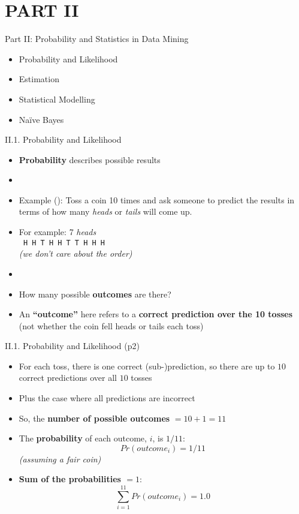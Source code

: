 \documentclass[handout]{beamer}
\newcommand{\strong}[1]{\textbf{\color{teal} #1}}
\newcommand{\stronger}[1]{\textbf{\color{purple} #1}}
\begin{document}
\section{PART II}
\begin{frame}{Part II: Probability and Statistics in Data Mining}
\begin{itemize}
\item[II.1.] Probability and Likelihood
\item[II.2.] Estimation
\item[II.3.] Statistical Modelling
\item[II.4.] Na\"{i}ve Bayes
\end{itemize}
\end{frame}
\begin{frame}{II.1. Probability and Likelihood}
\begin{itemize}
\item \stronger{Probability} describes possible results
\item[]
\item Example (\cite{gallistel:2015}):
Toss a coin 10 times and ask someone to predict the results in terms of how many \emph{heads} or \emph{tails} will come up.
\item[] For example: 7 \emph{heads}\\
	\texttt{ H H T H H T T H H H }\\
	\emph{(we don't care about the order)}
\item[]
\item How many possible \strong{outcomes} are there?
\item[--] An \strong{``outcome''} here refers to a \strong{correct prediction over the 10 tosses} (not whether the coin fell heads or tails each toss)
\end{itemize}
\end{frame}
\begin{frame}{II.1. Probability and Likelihood (p2)}
\begin{itemize}
\item[--] For each toss, there is one correct (sub-)prediction, so there are up to $10$ correct predictions over all $10$ tosses
\item[--] Plus the case where all predictions are incorrect
\item[--] So, the \strong{number of possible outcomes} $= 10 + 1 = 11$ 
\item The \stronger{probability} of each outcome, $i$, is $1 / 11$:
\[
	Pr(outcome_i) = 1 / 11
\]
	\emph{(assuming a fair coin)}
\item \stronger{Sum of the probabilities $=1$}:
\[
	\sum_{i=1}^{11} Pr(outcome_i) = 1.0
\]
\end{itemize}
\end{frame}
\end{document}
